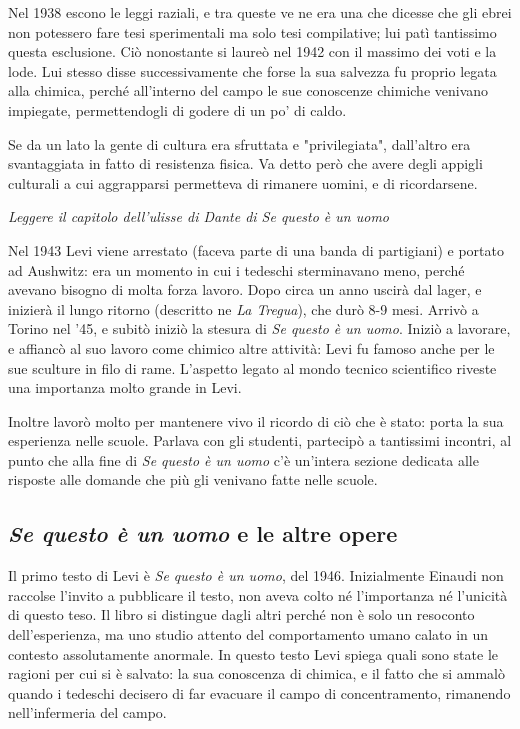 Nel 1938 escono le leggi raziali, e tra queste ve ne era una che dicesse che gli ebrei non potessero fare tesi sperimentali ma solo tesi compilative; lui patì tantissimo questa esclusione. Ciò nonostante si laureò nel 1942 con il massimo dei voti e la lode. Lui stesso disse successivamente che forse la sua salvezza fu proprio legata alla chimica, perché all'interno del campo le sue conoscenze chimiche venivano impiegate, permettendogli di godere di un po' di caldo.

Se da un lato la gente di cultura era sfruttata e "privilegiata", dall'altro era svantaggiata in fatto di resistenza fisica. Va detto però che avere degli appigli culturali a cui aggrapparsi permetteva di rimanere uomini, e di ricordarsene.

\emph{Leggere il capitolo dell'ulisse di Dante di \textit{Se questo è un uomo}}

Nel 1943 Levi viene arrestato (faceva parte di una banda di partigiani) e portato ad Aushwitz: era un momento in cui i tedeschi sterminavano meno, perché avevano bisogno di molta forza lavoro.
Dopo circa un anno uscirà dal lager, e inizierà il lungo ritorno (descritto ne \textit{La Tregua}), che durò 8-9 mesi. Arrivò a Torino nel '45, e subitò iniziò la stesura di \textit{Se questo è un uomo}.
Iniziò a lavorare, e affiancò al suo lavoro come chimico altre attività: Levi fu famoso anche per le sue sculture in filo di rame. L'aspetto legato al mondo tecnico scientifico riveste una importanza molto grande in Levi.

Inoltre lavorò molto per mantenere vivo il ricordo di ciò che è stato: porta la sua esperienza nelle scuole. Parlava con gli studenti, partecipò a tantissimi incontri, al punto che alla fine di \textit{Se questo è un uomo} c'è un'intera sezione dedicata alle risposte alle domande che più gli venivano fatte nelle scuole.

\subsection{\textit{Se questo è un uomo} e le altre opere}

Il primo testo di Levi è \textit{Se questo è un uomo}, del 1946. Inizialmente Einaudi non raccolse l'invito a pubblicare il testo, non aveva colto né l'importanza né l'unicità di questo teso. Il libro si distingue dagli altri perché non è solo un resoconto dell'esperienza, ma uno studio attento del comportamento umano calato in un contesto assolutamente anormale. In questo testo Levi spiega quali sono state le ragioni per cui si è salvato: la sua conoscenza di chimica, e il fatto che si ammalò quando i tedeschi decisero di far evacuare il campo di concentramento, rimanendo nell'infermeria del campo.

